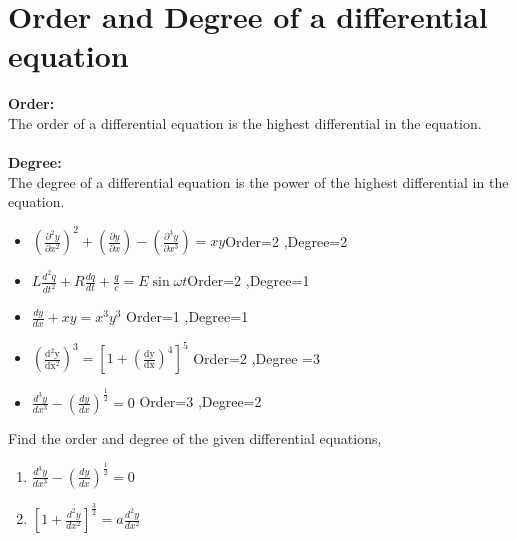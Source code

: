 \section{Order and Degree of a differential equation}
\textbf{Order:}\\The order of a differential equation is the highest differential in the equation.\\\\
\textbf{Degree:}\\The degree of a differential equation is the power of the highest differential in the equation.
\begin{example}
	\hspace{0.5cm}
	\begin{itemize}
		\item $\left(\frac{\partial^{2} y}{\partial x^{2}}\right)^{2}+\left(\frac{\partial y}{\partial x}\right)-\left(\frac{\partial^{3} y}{\partial x^{3}}\right)=x y$\hspace{0.5cm}Order=2 ,Degree=2
		\item   $ L \frac{d^{2} q}{d t^{2}}+R \frac{d q}{d t}+\frac{q}{c}=E \sin \omega t$\hspace{1cm}Order=2 ,Degree=1
		\item $\frac{dy}{dx}+xy=x^{3}y^{3}$ \hspace{2.7cm}Order=1 ,Degree=1
		\item $\left(\frac{\mathrm{d}^{2} \mathrm{y}}{\mathrm{d} \mathrm{x}^{2}}\right)^{3}=\left[1+\left(\frac{\mathrm{dy}}{\mathrm{dx}}\right)^{4}\right]^{5}$
	 \hspace{1.1cm} Order=2 ,Degree =3
	 \item $\frac{d^{3} y}{d x^{3}}-\left(\frac{d y}{d x}\right)^{\frac{1}{2}}=0$ \hspace{2.3cm} Order=3 ,Degree=2
	\end{itemize}
\end{example}
\begin{exercise}
Find the order and degree of the given differential equations, 

\begin{enumerate}
	\item $\frac{d^{3} y}{d x^{3}}-\left(\frac{d y}{d x}\right)^{\frac{1}{2}}=0$
	\item $\left[1+\frac{d^{2} y}{d x^{2}}\right]^{\frac{3}{2}}=a \frac{d^{2} y}{d x^{2}}$
\end{enumerate}
\end{exercise}
